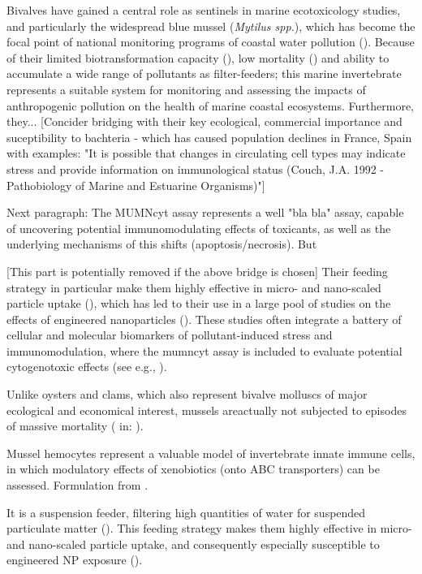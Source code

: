 Bivalves have gained a central role as sentinels in marine ecotoxicology studies, and particularly the widespread blue mussel (\emph{Mytilus spp.}), which has become the focal point of national monitoring programs of coastal water pollution (\cite{Goldberg1975, Beyer2017b, Cajarville2000}). Because of their limited biotransformation capacity (\cite{Beyer2017b}), low mortality (\cite{Ale2019, Costa2009}) and ability to accumulate a wide range of pollutants as filter-feeders; this marine invertebrate represents a suitable system for monitoring and assessing the impacts of anthropogenic pollution on the health of marine coastal ecosystems. Furthermore, they... [Concider bridging with their key ecological, commercial importance and suceptibility to bachteria - which has caused population declines in France, Spain with examples: "It is possible that changes in circulating cell types may indicate stress and provide information on immunological status (Couch, J.A. 1992 - Pathobiology of Marine and Estuarine Organisms)"]

Next paragraph: The MUMNcyt assay represents a well "bla bla" assay, capable of uncovering potential immunomodulating effects of toxicants, as well as the underlying mechanisms of this shifts (apoptosis/necrosis). But

[This part is potentially removed if the above bridge is chosen] Their feeding strategy in particular make them highly effective in micro- and nano-scaled particle uptake (\cite{Canesi2012}), which has led to their use in a large pool of studies on the effects of engineered nanoparticles (\cite{Rocha2015}). These studies often integrate a battery of cellular and molecular biomarkers of pollutant-induced stress and immunomodulation, where the \acrshort{mumncyt} assay is included to evaluate potential cytogenotoxic effects (see e.g., \cite{Rocha2014, Ruiz2015}).


Unlike oysters and clams, which also represent bivalve molluscs of major ecological and economical interest, mussels areactually not subjected to episodes of massive mortality (\cite{Costa2009} in: \cite{Rioult2014}).

Mussel hemocytes represent a valuable model of invertebrate innate immune cells, in which modulatory effects of xenobiotics (onto ABC transporters) can be assessed. Formulation from \cite{Rioult2014}.


\newpage

It is a suspension feeder, filtering high quantities of water for suspended particulate matter (\cite{Beyer2017b}). This feeding strategy makes them highly effective in micro- and nano-scaled particle uptake, and consequently especially susceptible to engineered NP exposure (\cite{Canesi2012}).




